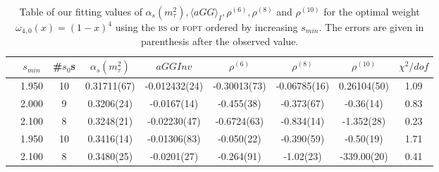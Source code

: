 \documentclass[../../index.tex]{subfiles}
\begin{document}
\begin{table}
  \centering
  \begin{adjustbox}{width=\textwidth}
    \begin{tabular}{ccccccccc}
      \toprule
      & \(s_{min}\) & \#\(s_0\)s & \(\alpha_s(m_\tau^2)\) & \(aGGInv\) & \(\rho^{(6)}\) & \(\rho^{(8)}\) & \(\rho^{(10)}\) & \(\chi^2/dof\)  \\
      \midrule
      \parbox[t]{2mm}{}
      & 1.950 & 10 & 0.31711(67) & -0.012432(24) & -0.30013(73) & -0.06785(16) & 0.26104(50) & 1.09 \\
      & 2.000 & 9 & 0.3206(24) & -0.0167(14) & -0.455(38) & -0.373(67) & -0.36(14) & 0.83 \\
      & 2.100 & 8 & 0.3248(21) & -0.02230(47) & -0.6724(63) & -0.834(14) & -1.352(28) & 0.23 \\
      \midrule
      \parbox[t]{2mm}{}
      & 1.950 & 10 & 0.3416(14) & -0.01306(83) & -0.050(22) & -0.390(59) & -0.50(19) & 1.71 \\
      & 2.100 & 8 & 0.3480(25) & -0.0201(27) & -0.264(91) & -1.02(23) & -339.00(20) & 0.41 \\
      \bottomrule
    \end{tabular}
  \end{adjustbox}
  \caption{Table of our fitting values of \(\alpha_s(m_\tau^2), \langle aGG
    \rangle_I, \rho^{(6)}, \rho^{(8)}\) and \(\rho^{(10)}\) for the optimal
    weight \(\omega_{4,0}(x)=(1-x)^4\) using the \textsc{bs} or \textsc{fopt}
    ordered by increasing \(s_{min}\). The errors are given in parenthesis after
    the observed value.}
  \label{table:fitOpt40AlD4D6D8D10}
\end{table}
\end{document}
